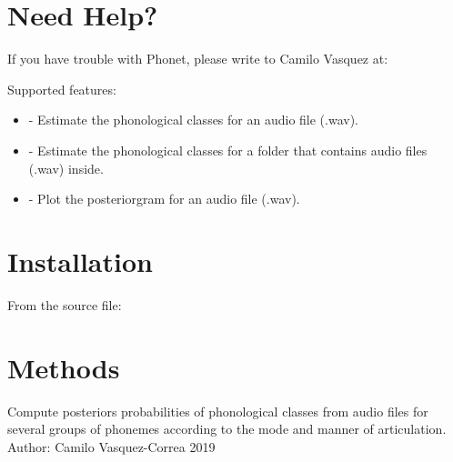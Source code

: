 \documentclass[letterpaper,10pt,english]{sphinxmanual}
\begin{document}
\chapter{Need Help?}
\label{\detokenize{help:welcome-to-phonet-s-documentation}}\label{\detokenize{help::doc}}\label{\detokenize{help:need-help}}
If you have trouble with Phonet, please write to Camilo Vasquez at: 

Supported features:
\begin{itemize}
\item {} 
 - Estimate the phonological classes for an audio file (.wav).

\item {} 
 - Estimate the phonological classes for a folder that contains audio files (.wav) inside.

\item {} 
 - Plot the posteriorgram for an audio file (.wav).

\end{itemize}


\chapter{Installation}
\label{\detokenize{index:installation}}
From the source file:

\begin{sphinxVerbatim}[commandchars=\\\{\}]
  
 
  
\end{sphinxVerbatim}


\chapter{Methods}
\label{\detokenize{index:module-phonet}}\label{\detokenize{index:methods}}
Compute posteriors probabilities of phonological classes from audio files for several groups of phonemes according to the mode and manner of articulation.
Author: Camilo Vasquez-Correa 2019
\end{document}
